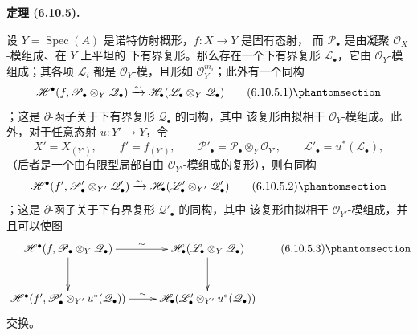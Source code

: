 \documentclass[UTF8,fontset=none,11pt,oneside,openany]{ctexbook}
\newenvironment{theorem}[1][]{%
  \par\medskip\noindent\textbf{定理 (#1).}\ %
}{\par}
\newcommand{\oldpage}[2][]{%
  \hypertarget{ega-source-page-#1-#2}{}%
  \marginnote{\scriptsize\textbf{#1}~|~#2}\ignorespaces}
\let\EGAOriginalLabel\label
\renewcommand{\label}[1]{\phantomsection\EGAOriginalLabel{#1}}
\begin{document}
\begin{theorem}[6.10.5]
设 $Y=\operatorname{Spec}(A)$ 是诺特仿射概形，$f:X\to Y$ 是固有态射，
而 $\mathscr P_\bullet$ 是由凝聚 $\mathscr O_X$-模组成、在 $Y$ 上平坦的
下有界复形。那么存在一个下有界复形 $\mathscr L_\bullet$，它由
$\mathscr O_Y$-模组成；其各项 $\mathscr L_i$ 都是
$\mathscr O_Y$-模，且形如 $\mathscr O_Y^{m_i}$；此外有一个同构
\[
  \mathscr H^\bullet
  (f,\mathscr P_\bullet\otimes_Y\mathscr Q_\bullet)
  \xrightarrow{\sim}
  \mathscr H_\bullet
  (\mathscr L_\bullet\otimes_Y\mathscr Q_\bullet)
  \tag{6.10.5.1}\label{III.6.10.5.1.fr}
\]
；这是 $\partial$-函子关于下有界复形 $\mathscr Q_\bullet$ 的同构，其中
该复形由拟相干 $\mathscr O_Y$-模组成。此外，对于任意态射
$u:Y'\to Y$，令
\[
  X'=X_{(Y')},
  \qquad
  f'=f_{(Y')},
  \qquad
  \mathscr P'_\bullet
  =
  \mathscr P_\bullet\otimes_Y\mathscr O_{Y'},
  \qquad
  \mathscr L'_\bullet=u^*(\mathscr L_\bullet),
\]
\oldpage[III]{174}
（后者是一个由有限型局部自由 $\mathscr O_{Y'}$-模组成的复形），则有同构
\[
  \mathscr H^\bullet
  (f',\mathscr P'_\bullet\otimes_{Y'}\mathscr Q'_\bullet)
  \xrightarrow{\sim}
  \mathscr H_\bullet
  (\mathscr L'_\bullet\otimes_{Y'}\mathscr Q'_\bullet)
  \tag{6.10.5.2}\label{III.6.10.5.2.fr}
\]
；这是 $\partial$-函子关于下有界复形 $\mathscr Q'_\bullet$ 的同构，其中
该复形由拟相干 $\mathscr O_{Y'}$-模组成，并且可以使图
\[
\xymatrix@C=25pt@R=30pt{
  \mathscr H^\bullet
  (f,\mathscr P_\bullet\otimes_Y\mathscr Q_\bullet)
  \ar[r]^-{\sim}\ar[d]
  &
  \mathscr H_\bullet
  (\mathscr L_\bullet\otimes_Y\mathscr Q_\bullet)
  \ar[d]
  \\
  \mathscr H^\bullet
  (f',\mathscr P'_\bullet\otimes_{Y'}u^*(\mathscr Q_\bullet))
  \ar[r]^-{\sim}
  &
  \mathscr H_\bullet
  (\mathscr L'_\bullet\otimes_{Y'}u^*(\mathscr Q_\bullet))
}
\tag{6.10.5.3}\label{III.6.10.5.3.fr}
\]
交换。
\end{theorem}
\end{document}
